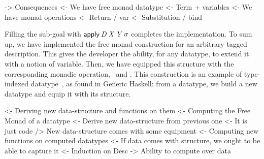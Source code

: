 \begin{wstructure}
    -> Consequences
        <- We have free monad datatype
            <- Term + variables
        <- We have monad operations
            <- Return / var
            <- Substitution / bind
\end{wstructure}

Filling the sub-goal with $\apply\: \V{D}\: \V{X}\: \V{Y}\:
\V{\sigma}$ completes the implementation. To sum up, we have
implemented the free monad construction for an arbitrary tagged
description. This gives the developer the ability, for any datatype,
to extend it with a notion of variable. Then, we have equipped this
structure with the corresponding monadic operation, \bind\ and
\return. This construction is an example of type-indexed
datatype~\cite{hinze:generic-haskell}, as found in Generic Haskell:
from a datatype, we build a new datatype and equip it with its
structure.

\begin{wstructure}
<- Deriving new data-structure and functions on them
    <- Computing the Free Monad of a datatype
        <- Derive new data-structure from previous one
            <- It is just code
        /> New data-structure comes with some equipment
    <- Computing new functions on computed datatypes
        <- If data comes with structure, we ought to be able to capture it
            <- Induction on Desc
            -> Ability to compute over data
\end{wstructure}

